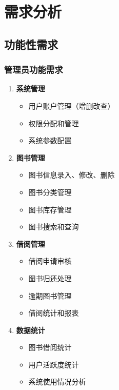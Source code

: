 \documentclass[12pt,a4paper]{article}
\begin{document}
\section{需求分析}

\subsection{功能性需求}

\subsubsection{管理员功能需求}
\begin{enumerate}
    \item \textbf{系统管理}
    \begin{itemize}
        \item 用户账户管理（增删改查）
        \item 权限分配和管理
        \item 系统参数配置
    \end{itemize}
    
    \item \textbf{图书管理}
    \begin{itemize}
        \item 图书信息录入、修改、删除
        \item 图书分类管理
        \item 图书库存管理
        \item 图书搜索和查询
    \end{itemize}
    
    \item \textbf{借阅管理}
    \begin{itemize}
        \item 借阅申请审核
        \item 图书归还处理
        \item 逾期图书管理
        \item 借阅统计和报表
    \end{itemize}
    
    \item \textbf{数据统计}
    \begin{itemize}
        \item 图书借阅统计
        \item 用户活跃度统计
        \item 系统使用情况分析
    \end{itemize}
\end{enumerate}
\end{document}
